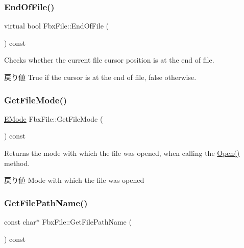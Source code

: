 \subsubsection{\texorpdfstring{End\+Of\+File()}{EndOfFile()}}
{\footnotesize\ttfamily virtual bool Fbx\+File\+::\+End\+Of\+File (\begin{DoxyParamCaption}{ }\end{DoxyParamCaption}) const\hspace{0.3cm}{\ttfamily [virtual]}}

Checks whether the current file cursor position is at the end of file. \begin{DoxyReturn}{戻り値}
True if the cursor is at the end of file, false otherwise. 
\end{DoxyReturn}
\mbox{\label{class_fbx_file_a26175571d3f5682ea7af8ac5ba1f640f}} 
\subsubsection{\texorpdfstring{Get\+File\+Mode()}{GetFileMode()}}
{\footnotesize\ttfamily \hyperlink{class_fbx_file_a0370e8fd17b3658f718e1350a6a6f462}{E\+Mode} Fbx\+File\+::\+Get\+File\+Mode (\begin{DoxyParamCaption}{ }\end{DoxyParamCaption}) const}

Returns the mode with which the file was opened, when calling the \hyperlink{class_fbx_file_a1942c2245eabf7f0507118226af13727}{Open()} method. \begin{DoxyReturn}{戻り値}
Mode with which the file was opened 
\end{DoxyReturn}
\mbox{\label{class_fbx_file_ace17e0fc453b1fa2f565af58eb16ad26}} 
\subsubsection{\texorpdfstring{Get\+File\+Path\+Name()}{GetFilePathName()}}
{\footnotesize\ttfamily const char$\ast$ Fbx\+File\+::\+Get\+File\+Path\+Name (\begin{DoxyParamCaption}{ }\end{DoxyParamCaption}) const}


